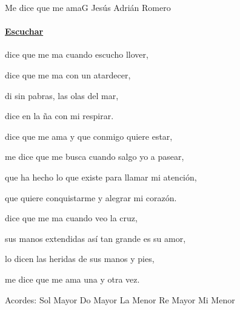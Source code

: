 \documentclass[12pt, spanish]{book}
\newcommand{\NotCCLIed}{\relax}
\begin{document}
    \begin{song}{Me dice que me ama}{G}
    {} %
    {Jesús Adrián Romero}
    {} %
    {} %
        \ifChordBk
        \paragraph{\mbox{}\hfill\protect\href{https://open.spotify.com/intl-es/track/5Q175erZOZJZHKaZzJFYDN}{Escuchar}\mbox{}\hfill}
        \fi



        \begin{SBOpGroup}
             dice que me ma cuando escucho llover,

             dice que me ma con un atardecer,

             di sin pabras,  las olas del mar,

             dice en la ña con mi respirar.
        \end{SBOpGroup}

        \begin{SBChorus}
             dice que me ama y que conmigo quiere estar,

            me dice que me busca cuando salgo yo a pasear,

            que ha hecho lo que existe para llamar mi atención,

            que quiere conquistarme y alegrar mi corazón.
        \end{SBChorus}

        \begin{SBOpGroup}
             dice que me ma cuando veo la cruz,

            sus manos extendidas así tan grande es su amor,

            lo dicen las heridas de sus manos y pies,

            me dice que me ama una y otra vez.
        \end{SBOpGroup}
        \ifChordBk
        \begin{SBOpGroup}
            Acordes:
            \upchord{\G}\qquad Sol Mayor \hfill
            \upchord{\C}\qquad Do Mayor \hfill\null\break
            \upchord{\Am}\qquad La Menor \hfill
            \upchord{\D}\qquad Re Mayor \hfill\null\break
            \upchord{\Em}\qquad Mi Menor \hfill\null\break
        \end{SBOpGroup}

        \fi
    \end{song}
\end{document}
